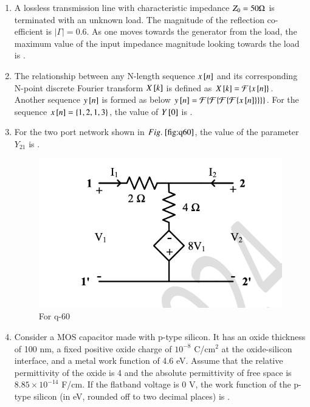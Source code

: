 \documentclass[journal,12pt,onecolumn]{IEEEtran}
\theoremstyle{remark}
\begin{document}
\begin{enumerate}
\hfill{}

\item A lossless transmission line with characteristic impedance $Z_0 = 50 \ohm$ is terminated with an unknown load. The magnitude of the reflection co-efficient is $|\Gamma| = 0.6$. As one moves towards the generator from the load, the maximum value of the input impedance magnitude looking towards the load  is \underline{\hspace{2cm}}.

\hfill{}

\item The relationship between any N-length sequence $x{}\left[n\right]$ and its corresponding N-point discrete Fourier transform $X{}\left[k\right]$ is defined as $X{}\left[k\right] = \mathcal{F}\{x{}\left[n\right]\}$. Another sequence $y{}\left[n\right]$ is formed as below $y{}\left[n\right] = \mathcal{F}\{\mathcal{F}\{\mathcal{F}\{\mathcal{F}\{x{}\left[n\right]\}\}\}\}$. For the sequence $x{}\left[n\right] = \{1, 2, 1, 3\}$, the value of $Y{}\left[0\right]$ is \underline{\hspace{2cm}}.

\hfill{}

\item For the two port network shown in $\figref{fig:q60}$, the value of the parameter $Y_{21}$  is \underline{\hspace{2cm}}.
\begin{figure}[H]
    \centering
    \includegraphics[width=0.5\columnwidth]{q60.png}
    \caption{For q-60}
    \label{fig:q60}
\end{figure}
\hfill{}

\item Consider a MOS capacitor made with p-type silicon. It has an oxide thickness of 100 nm, a fixed positive oxide charge of $10^{-8}$ C/cm$^2$ at the oxide-silicon interface, and a metal work function of 4.6 eV. Assume that the relative permittivity of the oxide is 4 and the absolute permittivity of free space is $8.85 \times 10^{-14}$ F/cm. If the flatband voltage is 0 V, the work function of the p-type silicon (in eV, rounded off to two decimal places) is \underline{\hspace{2cm}}.
\hfill{}


\end{enumerate}
\end{document}
